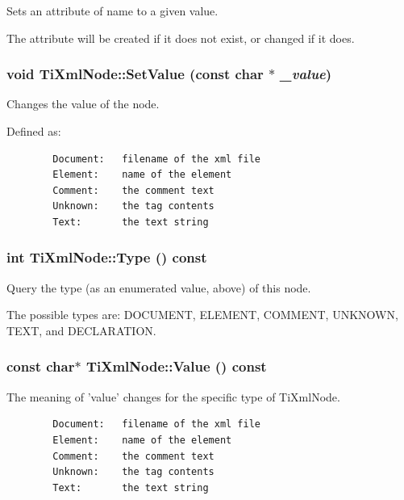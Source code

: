 Sets an attribute of name to a given value. 

The attribute will be created if it does not exist, or changed if it does.
\subsubsection{\setlength{\rightskip}{0pt plus 5cm}void Ti\-Xml\-Node::Set\-Value (const char $\ast$ {\em \_\-value})\hspace{0.3cm}{\tt  [inline, inherited]}}\label{classTiXmlNode_TiXmlUnknowna9}


Changes the value of the node. 

Defined as: 

\footnotesize\begin{verbatim}
		Document:	filename of the xml file
		Element:	name of the element
		Comment:	the comment text
		Unknown:	the tag contents
		Text:		the text string
		\end{verbatim}
\normalsize
{}
\subsubsection{\setlength{\rightskip}{0pt plus 5cm}int Ti\-Xml\-Node::Type () const\hspace{0.3cm}{\tt  [inline, inherited]}}\label{classTiXmlNode_TiXmlUnknowna62}


Query the type (as an enumerated value, above) of this node. 

The possible types are: DOCUMENT, ELEMENT, COMMENT, UNKNOWN, TEXT, and DECLARATION.
\subsubsection{\setlength{\rightskip}{0pt plus 5cm}const char$\ast$ Ti\-Xml\-Node::Value () const\hspace{0.3cm}{\tt  [inline, inherited]}}\label{classTiXmlNode_TiXmlUnknowna7}


The meaning of 'value' changes for the specific type of Ti\-Xml\-Node. 



\footnotesize\begin{verbatim}
		Document:	filename of the xml file
		Element:	name of the element
		Comment:	the comment text
		Unknown:	the tag contents
		Text:		the text string
		\end{verbatim}
\normalsize


